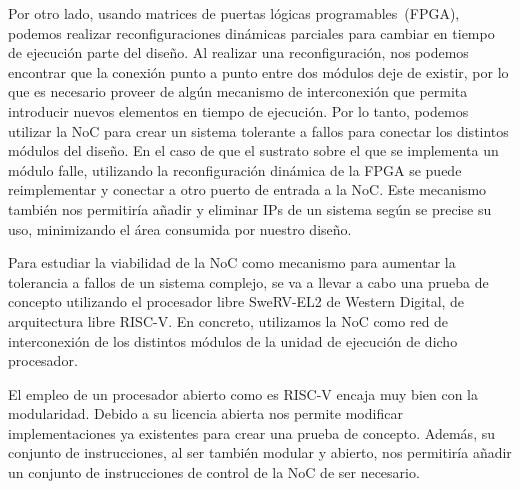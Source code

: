 Por otro lado, usando matrices de puertas lógicas programables~(\mbox{FPGA}), podemos realizar reconfiguraciones dinámicas parciales para cambiar en tiempo de ejecución parte del diseño. 
Al realizar una reconfiguración, nos podemos encontrar que la conexión punto a punto entre dos módulos deje de existir, por lo que es necesario proveer de algún mecanismo de interconexión que permita introducir nuevos elementos en tiempo de ejecución.
Por lo tanto, podemos utilizar la NoC para crear un sistema tolerante a fallos para conectar los distintos módulos del diseño. En el caso de que el sustrato sobre el que se implementa un módulo falle, utilizando la reconfiguración dinámica de la FPGA se puede reimplementar y conectar a otro puerto de entrada a la NoC. Este mecanismo también nos permitiría añadir y eliminar IPs de un sistema según se precise su uso, minimizando el área consumida por nuestro diseño.

Para estudiar la viabilidad de la NoC como mecanismo para aumentar la tolerancia a fallos de un sistema complejo, se va a llevar a cabo una prueba de concepto utilizando el procesador libre \mbox{SweRV-EL2} de Western Digital, de arquitectura libre RISC-V. En concreto, utilizamos la NoC como red de interconexión de los distintos módulos de la unidad de ejecución de dicho procesador.

El empleo de un procesador abierto como es RISC-V encaja muy bien con la modularidad. Debido a su licencia abierta nos permite modificar implementaciones ya existentes para crear una prueba de concepto. Además, su conjunto de instrucciones, al ser también modular y abierto, nos permitiría añadir un conjunto de instrucciones de control de la NoC de ser necesario.

